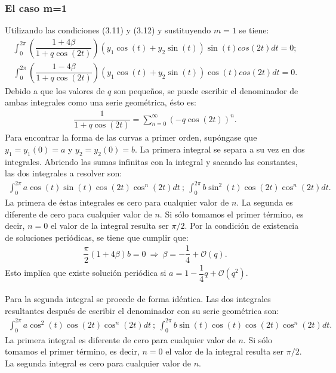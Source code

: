 \subsubsection{El caso m=1}
Utilizando las condiciones (3.11) y (3.12) y sustituyendo $m=1$ se tiene:
\begin{eqnarray*}
\int_{0}^{2\pi}  \left( \dfrac{1+4\beta}{1+q\cos(2t)}\right)(y_{1}\cos(t)+y_{2}\sin(t))\sin(t)cos(2t) dt=0;
\end{eqnarray*}
\begin{eqnarray*}
\int_{0}^{2\pi}  \left( \dfrac{1-4\beta}{1+q\cos(2t)}\right)(y_{1}\cos(t)+y_{2}\sin(t))\cos(t)cos(2t) dt=0.
\end{eqnarray*}
Debido a que los valores de $q$ son pequeños, se puede escribir el denominador de ambas integrales como una serie geométrica, ésto es:
\begin{eqnarray*}
\dfrac{1}{1+q\cos(2t)}=\displaystyle\sum_{n=0}^{\infty} (-q\cos(2t))^{n}. 
\end{eqnarray*}
Para encontrar la forma de las curvas a primer orden, supóngase que $y_{1}=y_{1}(0)=a$ y $y_{2}=y_{2}(0)=b$. La primera integral se separa a su vez en dos integrales. Abriendo las sumas infinitas con la integral y sacando las constantes, las dos integrales a resolver son:
\begin{eqnarray*}
\int_{0}^{2\pi} a\cos(t)\sin(t)\cos(2t)\cos^{n}(2t) dt \ ; \ \int_{0}^{2\pi} b\sin^{2}(t)\cos(2t)\cos^{n}(2t) dt.
\end{eqnarray*}
La primera de éstas integrales es cero para cualquier valor de $n$. La segunda es diferente de cero para cualquier valor de $n$. Si sólo tomamos el primer término, es decir, $n=0$ el valor de la integral resulta ser $\pi / 2$. Por la condición de existencia de soluciones periódicas, se tiene que cumplir que:
\begin{eqnarray}
\dfrac{\pi}{2}(1+4\beta)b=0 \ \Longrightarrow \ \beta = -\dfrac{1}{4} + \mathcal{O}(q).
\end{eqnarray}
Esto implíca que existe solución periódica si $a=1-\dfrac{1}{4}q+\mathcal{O}(q^{2})$.
\\
\\
Para la segunda integral se procede de forma idéntica. Las dos integrales resultantes después de escribir el denominador con su serie geométrica son:
\begin{eqnarray*}
\int_{0}^{2\pi} a\cos^{2}(t)\cos(2t)\cos^{n}(2t) dt \ ; \ \int_{0}^{2\pi} b\sin(t)\cos(t)\cos(2t)\cos^{n}(2t) dt.
\end{eqnarray*}
La primera integral es diferente de cero para cualquier valor de $n$. Si sólo tomamos el primer término, es decir, $n=0$ el valor de la integral resulta ser $\pi / 2$. La segunda integral es cero para cualquier valor de $n$.
